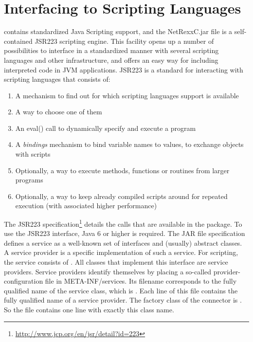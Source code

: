 \chapter{Interfacing to Scripting Languages}
\nr{} contains standardized Java Scripting
support, and the NetRexxC.jar file is a self-contained JSR223 scripting engine. This facility opens up a number of possibilities to interface in a standardized manner with several scripting languages and other infrastructure, and offers an easy way for including interpreted \nr{} code in JVM applications. JSR223 is a standard for interacting with scripting languages that consists of:
\begin{enumerate}
\item A mechanism to find out for which scripting languages support is
  available
\item A way to choose one of them
\item An eval() call to dynamically specify and execute a program
\item A \emph{bindings} mechanism to bind variable names to values, to exchange objects with scripts
\item Optionally, a way to execute methods, functions or routines from
  larger programs
\item Optionally, a way to keep already compiled scripts around for repeated execution (with associated higher performance)
\end{enumerate}

The JSR223 specification\footnote{\url{http://www.jcp.org/en/jsr/detail?id=223}}
details the calls that are available in the 
package. To use the JSR223 interface, Java 6 or higher is
required. The JAR file specification defines a service as a well-known
set of interfaces and (usually) abstract classes. A service provider
is a specific implementation of such a service. For scripting, the
service consists of . All
classes that implement this interface are service providers. Service
providers identify themselves by placing a so-called
provider-configuration file in META-INF/services. Its filename
corresponds to the fully qualified name of the service class, which is
. Each line of this file contains the
fully qualified name of a service provider. The factory
class of the \nr{} connector is . So the file  contains one line with exactly this class name.
